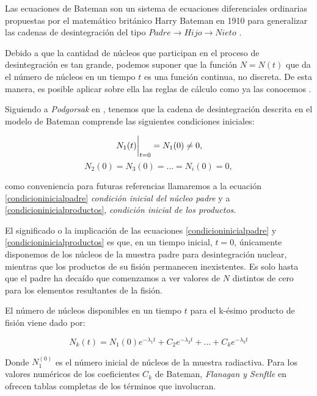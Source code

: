 \noindent Las ecuaciones de Bateman son un sistema de ecuaciones diferenciales ordinarias propuestas por el matemático británico Harry Bateman en 1910 para generalizar las cadenas de desintegración del tipo $Padre\rightarrow Hijo \rightarrow Nieto$ \cite{Podgorsak.2016}.

\noindent Debido a que la cantidad de núcleos que participan en el proceso de desintegración es tan grande, podemos suponer que la función $N=N(t)$ que da el número de núcleos en un tiempo $t$ es una función continua, no discreta. De esta manera, es posible aplicar sobre ella las reglas de cálculo como ya las conocemos \cite{Podgorsak.2016}. 

\noindent Siguiendo a \textit{Podgorsak} en \cite{Podgorsak.2016}, tenemos que la cadena de desintegración descrita en el modelo de Bateman comprende las siguientes condiciones iniciales:

\begin{equation}
    \eval{N_1(t)}_{t=0}=N_1(0)\neq 0,\label{condicioninicialpadre}
\end{equation}
\begin{equation}
    N_2(0)=N_3(0)=...=N_i(0)=0, \label{condicioninicialproductos}
\end{equation}

\noindent como conveniencia para futuras referencias llamaremos a la ecuación \ref{condicioninicialpadre} \textit{condición inicial del núcleo padre} y a \ref{condicioninicialproductos}, \textit{condición inicial de los productos}. 

\noindent El significado o la implicación de las ecuaciones \ref{condicioninicialpadre} y \ref{condicioninicialproductos} es que, en un tiempo inicial, $t=0$, únicamente disponemos de los núcleos de la muestra padre para desintegración nuclear, mientras que los productos de su fisión permanecen inexistentes. Es solo hasta que el padre ha decaído que comenzamos a ver valores de $N$ distintos de cero para los elementos resultantes de la fisión. 

\noindent El número de núcleos disponibles en un tiempo $t$ para el k-ésimo producto de fisión viene dado por:

\begin{equation}
        N_k(t)=N_1(0) e^{-\lambda_1 t}+C_2 e^{-\lambda_2 t}+...+C_k e^{-\lambda_k t} \label{iesimonucleo}
\end{equation}

\noindent Donde $N_1^{(0)}$ es el número inicial de núcleos de la muestra radiactiva. Para los valores numéricos de los coeficientes $C_k$ de Bateman, \textit{Flanagan y Senftle} en \cite{Flanagan1954} ofrecen tablas completas de los términos que involucran.

